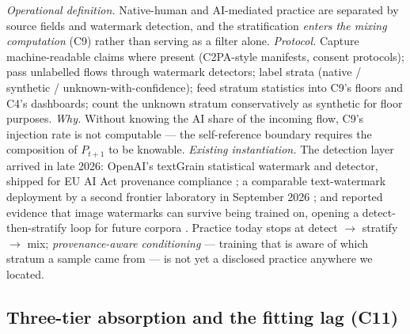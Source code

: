 \documentclass[10pt]{article}
\begin{document}
\emph{Operational definition.} Native-human and AI-mediated practice are separated by source fields and watermark detection, and the stratification \emph{enters the mixing computation} (C9) rather than serving as a filter alone. \emph{Protocol.} Capture machine-readable claims where present (C2PA-style manifests, consent protocols); pass unlabelled flows through watermark detectors; label strata (native / synthetic / unknown-with-confidence); feed stratum statistics into C9's floors and C4's dashboards; count the unknown stratum conservatively as synthetic for floor purposes. \emph{Why.} Without knowing the AI share of the incoming flow, C9's injection rate is not computable --- the self-reference boundary requires the composition of $P_{t+1}$ to be knowable. \emph{Existing instantiation.} The detection layer arrived in late 2026: OpenAI's textGrain statistical watermark and detector, shipped for EU AI Act provenance compliance \cite{ref42}; a comparable text-watermark deployment by a second frontier laboratory in September 2026 \cite{ref43}; and reported evidence that image watermarks can survive being trained on, opening a detect-then-stratify loop for future corpora \cite{ref44}. Practice today stops at detect $\to$ stratify $\to$ mix; \emph{provenance-aware conditioning} --- training that is aware of which stratum a sample came from --- is not yet a disclosed practice anywhere we located.

\subsection{Three-tier absorption and the fitting lag (C11)}
\end{document}
